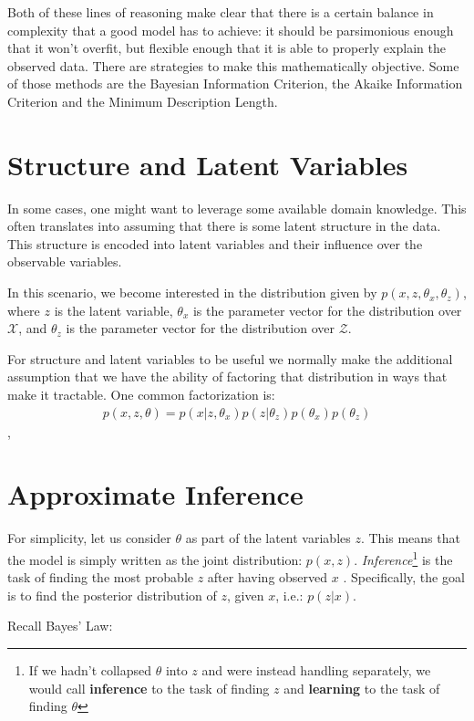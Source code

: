Both of these lines of reasoning make clear that there is a certain balance
in complexity that a good model has to achieve: it should be parsimonious enough
that it won't overfit, but flexible enough that it is able to properly explain the observed
data.  There are strategies to make this mathematically objective. Some of those
methods are the Bayesian Information Criterion, the Akaike Information Criterion
and the Minimum Description Length.

\section{Structure and Latent Variables}
\label{section:probmodellatvar}
In some cases, one might want to leverage some available domain knowledge. This
often translates into assuming that there is some latent structure in the data.
This structure is encoded into latent variables and their influence over the
observable variables.

In this scenario, we become interested in the distribution given by
$p(x, z, \theta_x, \theta_z)$, where $z$ is the latent variable, $\theta_x$ is
the parameter vector for the distribution over $\mathcal{X}$, and $\theta_z$ is
the parameter vector for the distribution over $\mathcal{Z}$.

For structure and latent variables to be useful we normally make the additional
assumption that we have the ability of factoring that distribution in ways that
make it tractable. One common factorization is:
\begin{align}
    p(x, z, \theta) = p(x| z, \theta_x) p(z | \theta_z) p(\theta_x) p(\theta_z)
\end{align},

\section{Approximate Inference}
\label{section:probmodelinf}
For simplicity, let us consider $\theta$ as part of the latent variables $z$.
This means that the model is simply written as the joint distribution: $p(x, z)$.
\emph{Inference}\footnote{If we hadn't collapsed $\theta$ into $z$ and were instead handling
separately, we would call \textbf{inference} to the task of finding $z$ and
\textbf{learning} to the task of finding $\theta$} is the task of finding the 
most probable $z$ after having observed $x$ . Specifically, the goal is
to find the posterior distribution of $z$, given $x$, i.e.: $p(z|x)$.

Recall Bayes' Law:

